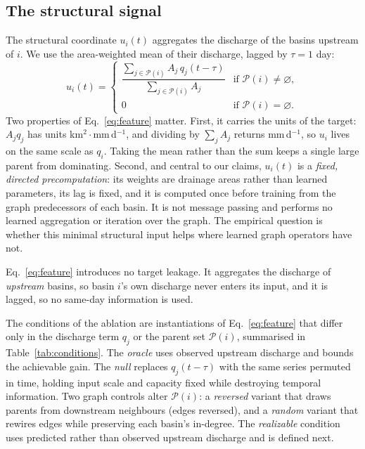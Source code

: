 \documentclass[11pt]{article}
\begin{document}
\subsection{The structural signal}
\label{sec:feature}

The structural coordinate $u_i(t)$ aggregates the discharge of the basins upstream of $i$. We use the
area-weighted mean of their discharge, lagged by $\tau=1$ day:
\begin{equation}
\label{eq:feature}
u_i(t) =
\begin{cases}
\dfrac{\displaystyle\sum_{j\in\mathcal{P}(i)} A_j\, q_j(t-\tau)}
      {\displaystyle\sum_{j\in\mathcal{P}(i)} A_j}
  & \text{if } \mathcal{P}(i)\neq\varnothing,\\[14pt]
0 & \text{if } \mathcal{P}(i)=\varnothing.
\end{cases}
\end{equation}
Two properties of Eq.~\eqref{eq:feature} matter. First, it carries the units of the target: $A_j q_j$
has units km$^2\cdot$mm\,d$^{-1}$, and dividing by $\sum_j A_j$ returns mm\,d$^{-1}$, so $u_i$ lives
on the same scale as $q_i$. Taking the mean rather than the sum keeps a single large parent from
dominating. Second, and central to our claims, $u_i(t)$ is a \emph{fixed, directed precomputation}: its weights
are drainage areas rather than learned parameters, its lag is fixed, and it is computed once before
training from the graph predecessors of each basin. It is not message passing and performs no learned
aggregation or iteration over the graph. The empirical question is whether this minimal structural
input helps where learned graph operators have not.

Eq.~\eqref{eq:feature} introduces no target leakage. It aggregates the discharge of \emph{upstream}
basins, so basin $i$'s own discharge never enters its input, and it is lagged, so no same-day
information is used.

The conditions of the ablation are instantiations of Eq.~\eqref{eq:feature} that differ only in the
discharge term $q_j$ or the parent set $\mathcal{P}(i)$, summarised in Table~\ref{tab:conditions}.
The \emph{oracle} uses observed upstream discharge and bounds the achievable gain.
The \emph{null} replaces $q_j(t-\tau)$ with the same series permuted in time, holding input scale and
capacity fixed while destroying temporal information. Two graph controls alter $\mathcal{P}(i)$: a
\emph{reversed} variant that draws parents from downstream neighbours (edges reversed), and a
\emph{random} variant that rewires edges while preserving each basin's in-degree. The \emph{realizable}
condition uses predicted rather than observed upstream discharge and is defined next.
\end{document}

